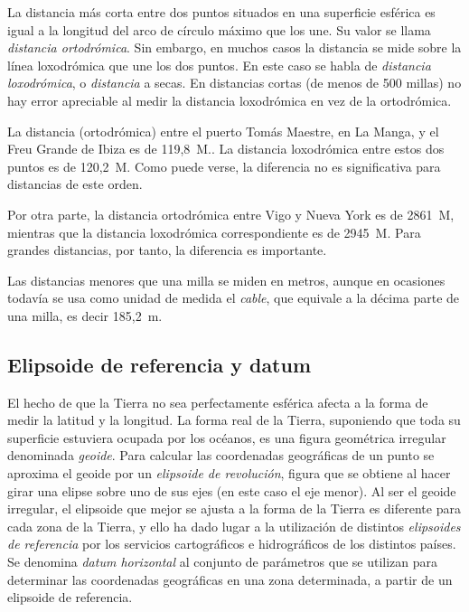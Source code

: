 La distancia más corta entre dos puntos situados en una superficie esférica es igual a la longitud del arco de círculo máximo que los une. Su valor se llama \emph{distancia ortodrómica}. Sin embargo, en muchos casos la distancia se mide sobre la línea loxodrómica que une los dos puntos. En este caso se habla de\emph{ distancia loxodrómica}, o \emph{distancia} a secas. En distancias cortas (de menos de 500 millas) no hay error apreciable al medir la distancia loxodrómica en vez de la ortodrómica. 

\begin{ejemplo}
La distancia (ortodrómica) entre el puerto Tomás Maestre, en La Manga, y el Freu Grande de Ibiza es de 119,8~M.. La distancia loxodrómica  entre estos dos puntos es de 120,2~M. Como puede verse, la diferencia no es significativa para distancias de este orden. 

Por otra parte, la distancia ortodrómica entre Vigo y  Nueva York es de 2861~M, mientras que la distancia loxodrómica correspondiente es de 2945~M. Para grandes distancias, por tanto, la diferencia es importante.
\end{ejemplo}

Las distancias menores que una milla se miden en metros, aunque en ocasiones todavía se usa como unidad de medida el \emph{cable}, que equivale a la décima parte de una milla, es decir 185,2~m.

\subsection{Elipsoide de referencia y datum}


 
El hecho de que la Tierra no sea perfectamente esférica afecta a la forma de medir la latitud y la longitud. La forma real de la Tierra, suponiendo que toda su superficie estuviera ocupada por los océanos, es una figura geométrica irregular denominada \emph{geoide}. Para calcular las coordenadas geográficas de un punto se aproxima el geoide por un \emph{elipsoide de revolución}, figura que se obtiene al hacer girar una elipse sobre uno de sus ejes (en este 
caso el eje menor). Al ser el geoide irregular, el elipsoide que mejor se ajusta a la forma de la Tierra es diferente para cada zona de la Tierra, y ello ha dado lugar a la utilización de distintos \emph{elipsoides de referencia} por los servicios cartográficos e hidrográficos de los distintos países. Se denomina \emph{datum horizontal} al conjunto de parámetros que se utilizan para determinar las coordenadas geográficas en una zona determinada, a partir de un elipsoide de referencia. 

